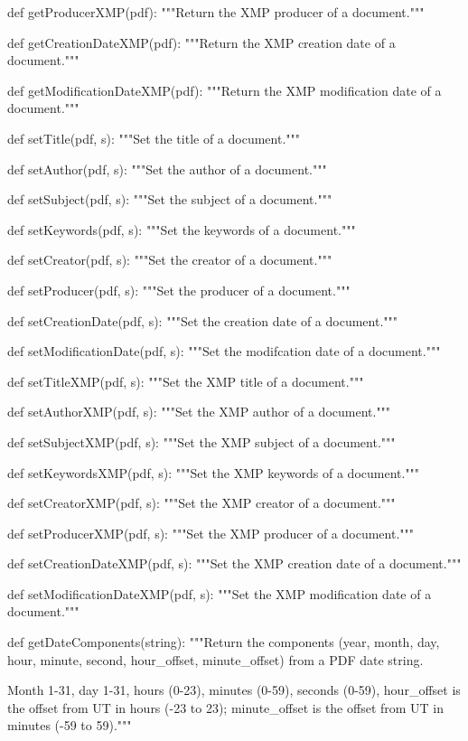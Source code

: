 def getProducerXMP(pdf):
    """Return the XMP producer of a document."""

def getCreationDateXMP(pdf):
    """Return the XMP creation date of a document."""

def getModificationDateXMP(pdf):
    """Return the XMP modification date of a document."""

def setTitle(pdf, s):
    """Set the title of a document."""

def setAuthor(pdf, s):
    """Set the author of a document."""

def setSubject(pdf, s):
    """Set the subject of a document."""

def setKeywords(pdf, s):
    """Set the keywords of a document."""

def setCreator(pdf, s):
    """Set the creator of a document."""

def setProducer(pdf, s):
    """Set the producer of a document."""

def setCreationDate(pdf, s):
    """Set the creation date of a document."""

def setModificationDate(pdf, s):
    """Set the modifcation date of a document."""

def setTitleXMP(pdf, s):
    """Set the XMP title of a document."""

def setAuthorXMP(pdf, s):
    """Set the XMP author of a document."""

def setSubjectXMP(pdf, s):
    """Set the XMP subject of a document."""

def setKeywordsXMP(pdf, s):
    """Set the XMP keywords of a document."""

def setCreatorXMP(pdf, s):
    """Set the XMP creator of a document."""

def setProducerXMP(pdf, s):
    """Set the XMP producer of a document."""

def setCreationDateXMP(pdf, s):
    """Set the XMP creation date of a document."""

def setModificationDateXMP(pdf, s):
    """Set the XMP modification date of a document."""

def getDateComponents(string):
    """Return the components (year, month, day, hour, minute, second,
    hour_offset, minute_offset) from a PDF date string.

    Month 1-31, day 1-31, hours (0-23), minutes (0-59), seconds (0-59),
    hour_offset is the offset from UT in hours (-23 to 23); minute_offset is
    the offset from UT in minutes (-59 to 59)."""

